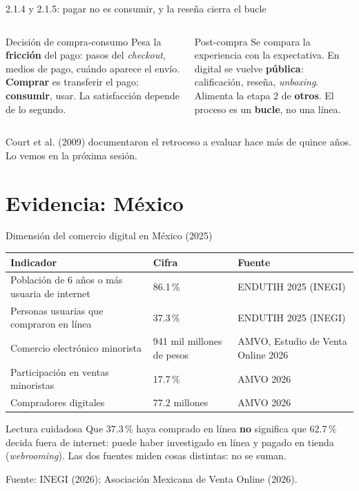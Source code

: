 \documentclass[aspectratio=169,xcolor=dvipsnames]{beamer}
\newcommand{\fuente}[1]{{\tiny\color{IPNgris}Fuente: #1}}
\begin{document}
\begin{frame}{2.1.4 y 2.1.5: pagar no es consumir, y la reseña cierra el bucle}
\begin{columns}[T]
  \begin{block}{Decisión de compra-consumo}
    \small Pesa la \textbf{fricción} del pago: pasos del \textit{checkout}, medios de pago, cuándo aparece el envío. \textbf{Comprar} es transferir el pago; \textbf{consumir}, usar. La satisfacción depende de lo segundo.
  \end{block}
  \begin{exampleblock}{Post-compra}
    \small Se compara la experiencia con la expectativa. En digital se vuelve \textbf{pública}: calificación, reseña, \textit{unboxing}. Alimenta la etapa 2 de \textbf{otros}. El proceso es un \textbf{bucle}, no una línea.
  \end{exampleblock}
\end{columns}
\vspace{6pt}
{\small\color{IPNgris} Court et al. (2009) documentaron el retroceso a evaluar hace más de quince años. Lo vemos en la próxima sesión.}
\end{frame}

\section[Evidencia]{Evidencia: México}

\begin{frame}{Dimensión del comercio digital en México (2025)}
\footnotesize
\begin{center}
\begin{tabular}{@{}>{\raggedright}p{5.4cm}>{\raggedright}p{2.5cm}>{\raggedright\arraybackslash}p{3.8cm}@{}}
\toprule
\textbf{Indicador} & \textbf{Cifra} & \textbf{Fuente} \\
\midrule
Población de 6 años o más usuaria de internet & 86.1\,\% & ENDUTIH 2025 (INEGI) \\
Personas usuarias que compraron en línea & 37.3\,\% & ENDUTIH 2025 (INEGI) \\
Comercio electrónico minorista & 941 mil millones de pesos & AMVO, Estudio de Venta Online 2026 \\
Participación en ventas minoristas & 17.7\,\% & AMVO 2026 \\
Compradores digitales & 77.2 millones & AMVO 2026 \\
\bottomrule
\end{tabular}
\end{center}
\vspace{2pt}
\begin{alertblock}{Lectura cuidadosa}
  \scriptsize Que 37.3\,\% haya comprado en línea \textbf{no} significa que 62.7\,\% decida fuera de internet: puede haber investigado en línea y pagado en tienda (\textit{webrooming}). Las dos fuentes miden cosas distintas: no se suman.
\end{alertblock}
\fuente{INEGI (2026); Asociación Mexicana de Venta Online (2026).}
\end{frame}
\end{document}
